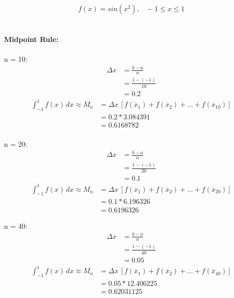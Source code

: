 \documentclass{article}
\begin{document}
    $$ f(x) = sin(x^{2}), \;\;\; -1 \leq x \leq 1 $$ \\\\
    \textbf{Midpoint Rule:}\\\\
    n = 10:\\
    \begin{align*}
        \Delta x &= \frac{b-a}{n}\\
        &= \frac{1-(-1)}{10}\\
        &= 0.2
    \end{align*}
    \begin{align*}
        \int_{-1}^{1} f(x) \, dx \approx M_{n} &= \Delta x \, [f(\overline{x}_1)+f(\overline{x}_2)+...+f(\overline{x}_{10})] \\
        &= 0.2 * 3.084391 \\
        &= 0.6168782 \\
    \end{align*}

    n = 20:\\
    \begin{align*}
        \Delta x &= \frac{b-a}{n} \\
        &= \frac{1-(-1)}{20} \\
        &= 0.1
    \end{align*}
    \begin{align*}
        \int_{-1}^{1} f(x) \, dx \approx M_{n} &= \Delta x \, [f(\overline{x}_1)+f(\overline{x}_2)+...+f(\overline{x}_{20})] \\
        &= 0.1 * 6.196326 \\
        &= 0.6196326
    \end{align*}

    n = 40:\\
    \begin{align*}
        \Delta x &= \frac{b-a}{n}\\
        &= \frac{1-(-1)}{40}\\
        &= 0.05
    \end{align*}
    \begin{align*}
        \int_{-1}^{1} f(x) \, dx \approx M_{n} &= \Delta x \, [f(\overline{x}_1)+f(\overline{x}_2)+...+f(\overline{x}_{40})] \\
        &= 0.05 * 12.406225\\
        &= 0.62031125
    \end{align*} \\\\
\end{document}
